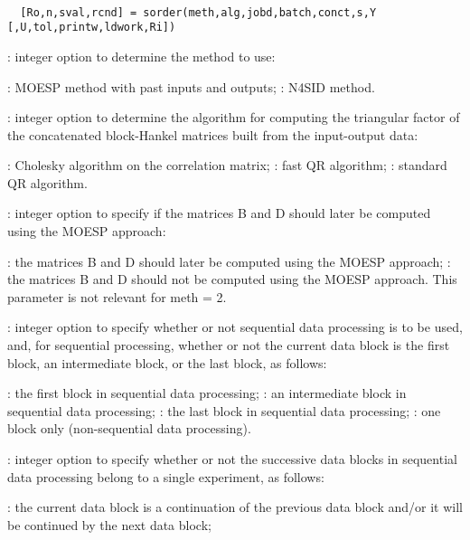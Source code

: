 \begin{mandesc}
   \\ %
\end{mandesc}
\begin{calling_sequence}
\begin{verbatim}
  [Ro,n,sval,rcnd] = sorder(meth,alg,jobd,batch,conct,s,Y [,U,tol,printw,ldwork,Ri])  
\end{verbatim}
\end{calling_sequence}
\begin{parameters}
  \begin{varlist}
    : integer option to determine the method to use:
    \begin{varlist}
      : MOESP method with past inputs and outputs;
      : N4SID method.
    \end{varlist}
    : integer option to determine the algorithm for computing the
    triangular factor of the concatenated block-Hankel matrices built from the
    input-output data:
    \begin{varlist}
      : Cholesky algorithm on the correlation matrix;
      : fast QR algorithm;
      : standard QR algorithm.
    \end{varlist}
    : integer option to specify if the matrices B and D should later be computed using the MOESP approach:
    \begin{varlist}
      : the matrices B and D should later be computed using the MOESP approach;
      : the matrices B and D should not be computed using the MOESP approach.
      This parameter is not relevant for meth = 2.
    \end{varlist}
    : integer option to specify whether or not sequential data
    processing is to be used, and, for sequential processing, whether or not the
    current data block is the first block, an intermediate block, or the last
    block, as follows:
    \begin{varlist}
      : the first block in sequential data processing;
      : an intermediate block in sequential data processing;
      : the last block in sequential data processing;
      : one block only (non-sequential data processing).
    \end{varlist}
    : integer option to specify whether or not the successive data
    blocks in sequential data processing belong to a single experiment, as
    follows:
    \begin{varlist}
      : the current data block is a continuation of the previous data
      block and/or it will be continued by the next data block;


\end{varlist}
\end{varlist}
\end{parameters}
